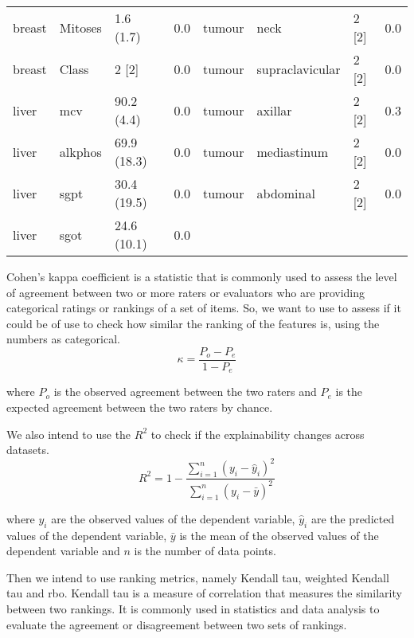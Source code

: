\begin{small}
\begin{table}[H]
\begin{tabularx}{\textwidth}{lXll|lXll}
                breast  & Mitoses                        & 1.6 (1.7)    & 0.0      & tumour   & neck            & 2 {[}2{]}    & 0.0      \\
                breast  & Class                          & 2 {[}2{]}    & 0.0      & tumour   & supraclavicular & 2 {[}2{]}    & 0.0      \\
                liver   & mcv                            & 90.2 (4.4)   & 0.0      & tumour   & axillar         & 2 {[}2{]}    & 0.3      \\
                liver   & alkphos                        & 69.9 (18.3)  & 0.0      & tumour   & mediastinum     & 2 {[}2{]}    & 0.0      \\
                liver   & sgpt                           & 30.4 (19.5)  & 0.0      & tumour   & abdominal       & 2 {[}2{]}    & 0.0      \\
                liver   & sgot                           & 24.6 (10.1)  & 0.0      &         &                 &              &          \\
                  \bottomrule
                \end{tabularx}
    
            \end{table}
        \end{small}
Cohen's kappa coefficient \cite{doi:10.1177/001316446002000104}  is a statistic that is commonly used to assess the level of agreement between two or more raters or evaluators who are providing categorical ratings or rankings of a set of items. So, we want to use to assess if it could be of use to check how similar the ranking of the features is, using the numbers as categorical.
\[
\kappa = \frac{{P_o - P_e}}{{1 - P_e}}
\]

where \(P_o\) is the observed agreement between the two raters and \(P_e\) is the expected agreement between the two raters by chance.



We also intend to use the $R^2$ to check if the explainability changes across datasets.
\[
R^2 = 1 - \frac{{\sum_{i=1}^n (y_i - \hat{y}_i)^2}}{{\sum_{i=1}^n (y_i - \bar{y})^2}}
\]

where \(y_i\) are the observed values of the dependent variable, \(\hat{y}_i\) are the predicted values of the dependent variable, \(\bar{y}\) is the mean of the observed values of the dependent variable and \(n\) is the number of data points.

Then we intend to use ranking metrics, namely Kendall tau, weighted Kendall tau and \ac{rbo}.
Kendall tau is a measure of correlation that measures the similarity between two rankings. It is commonly used in statistics and data analysis to evaluate the agreement or disagreement between two sets of rankings.

